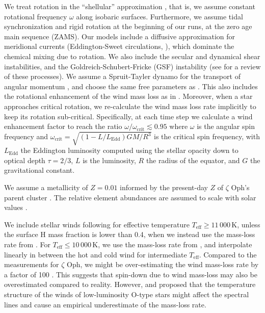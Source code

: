 \documentclass[twocolumn,twocolappendix,trackchanges]{aastex63}
\newcommand{\kms}{{\mathrm{km\ s^{-1}}}}
\newcommand{\zoph}{$\zeta$ Oph}
\begin{document}
We treat rotation in the ``shellular'' approximation
\citep[e.g.,][]{zahn:92, ekstrom:12}, that is, we assume constant
rotational frequency $\omega$ along isobaric surfaces. Furthermore, we
assume tidal synchronization and rigid rotation at the beginning of
our runs, at the zero age main sequence (ZAMS). %
Our models include a diffusive
approximation for meridional currents (Eddington-Sweet circulations,
\citealt{sweet:50}), which dominate the chemical mixing due to
rotation. We also include the secular and dynamical shear
instabilities, and the Goldreich-Schubert-Fricke (GSF) instability
(see \cite{heger:00} for a review of these processes).  
We assume a
Spruit-Tayler dynamo for the transport of angular momentum
\citep{spruit:02}, and choose the same free parameters as
\cite{heger:00}. This also includes the rotational enhancement of the
wind mass loss as in \cite{langer:98}. Moreover, when a star
approaches critical rotation, we re-calculate the wind mass
loss rate implicitly to keep its rotation sub-critical. Specifically, at each
time step we calculate a wind enhancement factor to reach the ratio
$\omega/\omega_\mathrm{crit}\lesssim 0.95$ where $\omega$ is the
angular spin frequency and
$\omega_\mathrm{crit}=\sqrt{(1-L/L_\mathrm{Edd})GM/R^3}$ is the critical spin frequency, with
$L_\mathrm{Edd}$ the Eddington luminosity computed using the stellar
opacity down to optical depth $\tau=2/3$, $L$ is the luminosity, $R$
the radius of the equator, and $G$ the gravitational
constant. %

We assume a metallicity of $Z=0.01$ informed by the present-day $Z$ of
\zoph's parent cluster \citep{murphy:21}. The relative
element abundances are assumed to scale with solar values \citep{grevesse:98}.

We include stellar winds following \cite{vink:00,vink:01} for
effective temperature $T_\mathrm{eff}\geq 11\,000$\,K, unless the
surface H mass fraction is lower than 0.4, when we instead use
the mass-loss rate from \cite{nugis:00}. For $T_\mathrm{eff}\leq 10\,000$\,K, we use the
mass-loss rate from \cite{dejager:88}, and interpolate linearly in
between the hot and cold wind for intermediate $T_\mathrm{eff}$. 
Compared to the measurements for
\zoph, we might be over-estimating the wind mass-loss rate by a factor
of 100 \citep[``weak wind problem'', see][]{marcolino:09}. This
suggests that spin-down due to wind mass-loss may also be
overestimated compared to reality. However, \cite{lucy:12} and
\cite{lagae:21} proposed that the temperature structure of the winds
of low-luminosity O-type stars might affect the spectral lines and
cause an empirical underestimate of the mass-loss rate. 
\end{document}
